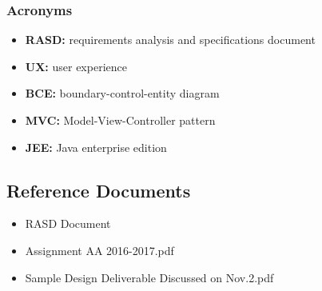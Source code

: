 \subsubsection{Acronyms}
\begin{itemize}
\item \textbf{RASD:} requirements analysis and specifications document
\item \textbf{UX:} user experience
\item \textbf{BCE:} boundary-control-entity diagram
\item \textbf{MVC:} Model-View-Controller pattern 
\item \textbf{JEE:} Java enterprise edition
\end{itemize}	

\subsection{Reference Documents}
\begin{itemize}
\item RASD Document
\item Assignment AA 2016-2017.pdf
\item Sample Design Deliverable Discussed on Nov.2.pdf
\end{itemize}


